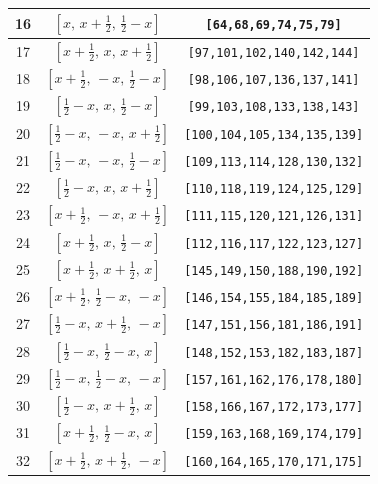 \documentclass[fleqn,8pt]{jsarticle}
\begin{document}
\begin{longtable}{ccc}
16 & $\left[ x,\, x + \frac{1}{2},\, \frac{1}{2} - x \right]$ & {\tt [64,68,69,74,75,79]} \\ \hline
17 & $\left[ x + \frac{1}{2},\, x,\, x + \frac{1}{2} \right]$ & {\tt [97,101,102,140,142,144]} \\ \hline
18 & $\left[ x + \frac{1}{2},\, - x,\, \frac{1}{2} - x \right]$ & {\tt [98,106,107,136,137,141]} \\ \hline
19 & $\left[ \frac{1}{2} - x,\, x,\, \frac{1}{2} - x \right]$ & {\tt [99,103,108,133,138,143]} \\ \hline
20 & $\left[ \frac{1}{2} - x,\, - x,\, x + \frac{1}{2} \right]$ & {\tt [100,104,105,134,135,139]} \\ \hline
21 & $\left[ \frac{1}{2} - x,\, - x,\, \frac{1}{2} - x \right]$ & {\tt [109,113,114,128,130,132]} \\ \hline
22 & $\left[ \frac{1}{2} - x,\, x,\, x + \frac{1}{2} \right]$ & {\tt [110,118,119,124,125,129]} \\ \hline
23 & $\left[ x + \frac{1}{2},\, - x,\, x + \frac{1}{2} \right]$ & {\tt [111,115,120,121,126,131]} \\ \hline
24 & $\left[ x + \frac{1}{2},\, x,\, \frac{1}{2} - x \right]$ & {\tt [112,116,117,122,123,127]} \\ \hline
25 & $\left[ x + \frac{1}{2},\, x + \frac{1}{2},\, x \right]$ & {\tt [145,149,150,188,190,192]} \\ \hline
26 & $\left[ x + \frac{1}{2},\, \frac{1}{2} - x,\, - x \right]$ & {\tt [146,154,155,184,185,189]} \\ \hline
27 & $\left[ \frac{1}{2} - x,\, x + \frac{1}{2},\, - x \right]$ & {\tt [147,151,156,181,186,191]} \\ \hline
28 & $\left[ \frac{1}{2} - x,\, \frac{1}{2} - x,\, x \right]$ & {\tt [148,152,153,182,183,187]} \\ \hline
29 & $\left[ \frac{1}{2} - x,\, \frac{1}{2} - x,\, - x \right]$ & {\tt [157,161,162,176,178,180]} \\ \hline
30 & $\left[ \frac{1}{2} - x,\, x + \frac{1}{2},\, x \right]$ & {\tt [158,166,167,172,173,177]} \\ \hline
31 & $\left[ x + \frac{1}{2},\, \frac{1}{2} - x,\, x \right]$ & {\tt [159,163,168,169,174,179]} \\ \hline
32 & $\left[ x + \frac{1}{2},\, x + \frac{1}{2},\, - x \right]$ & {\tt [160,164,165,170,171,175]} \\
\end{longtable}
\renewcommand{\arraystretch}{1.2}
\end{document}
